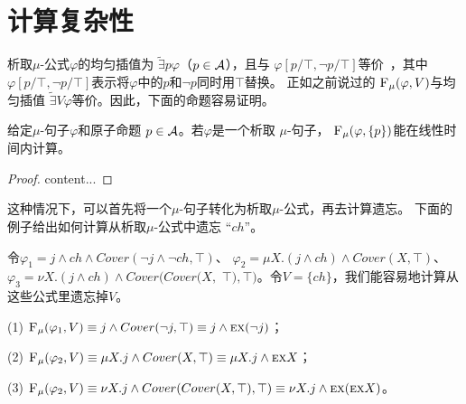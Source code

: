 \section{计算复杂性}
析取$\mu$-公式$\varphi$的均匀插值为 $\widetilde{\exists}p \varphi$（$p\in {\cal A}$），且与 $\varphi[p/\top,\neg p/\top]$等价~\cite{d2006modal}，其中$\varphi[p/\top,\neg p/\top]$表示将$\varphi$中的$p$和$\neg p$同时用$\top$替换。
正如之前说过的 ${\textsc{F}_{\textsc{$\mu$}}}(\varphi, V)$与均匀插值 $\widetilde{\exists}V \varphi$等价\cite{d2006modal}。因此，下面的命题容易证明。
\begin{corollary}\label{pro:disLiT}
	给定$\mu$-句子$\varphi$和原子命题 $p\in {\cal A}$。若$\varphi$是一个析取 $\mu$-句子， ${\textsc{F}_{\textsc{$\mu$}}}(\varphi, \{p\})$能在线性时间内计算。
\end{corollary}
\begin{proof}
	content...
\end{proof}

这种情况下，可以首先将一个$\mu$-句子转化为析取$\mu$-公式，再去计算遗忘。
下面的例子给出如何计算从析取$\mu$-公式中遗忘 “$ch$”。
\begin{example}
	令$\varphi_1=  j \wedge ch \wedge Cover(\neg j \wedge \neg ch, \top)$、 $\varphi_2= \mu X. (j \wedge ch) \wedge Cover(X, \top)$、 $\varphi_3=  \nu X. (j \wedge ch) \wedge Cover(Cover(X,$ $\top), \top)$。令$V=\{ch\}$，我们能容易地计算从这些公式里遗忘掉$V$。
	
	(1) ${\textsc{F}_{\textsc{$\mu$}}}(\varphi_1, V) \equiv j \wedge Cover(\neg j, \top) \equiv j \wedge \textsc{e} \textsc{x}(\neg j)$；
	
	(2) ${\textsc{F}_{\textsc{$\mu$}}}(\varphi_2, V) \equiv \mu X. j  \wedge Cover(X, \top) \equiv \mu X. j \wedge \textsc{e} \textsc{x} X$；
	
	(3) ${\textsc{F}_{\textsc{$\mu$}}}(\varphi_2, V) \equiv \nu X. j \wedge Cover(Cover(X, \top), \top) \equiv \nu X. j \wedge \textsc{e} \textsc{x}(\textsc{e} \textsc{x} X)$。
\end{example}

